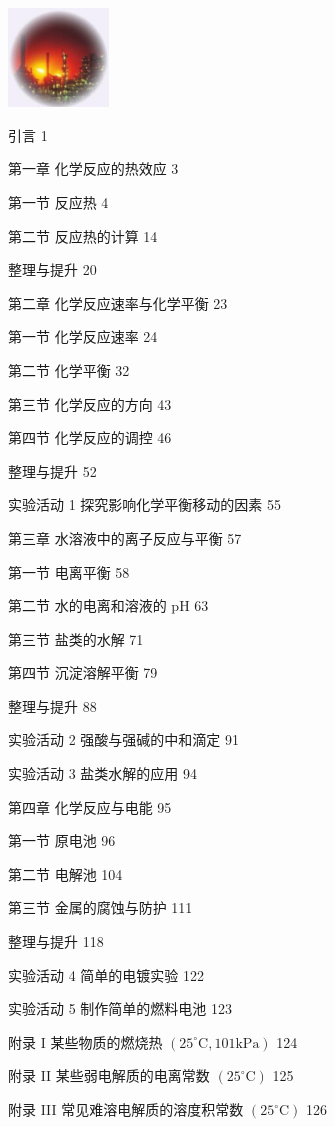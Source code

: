 \documentclass[10pt]{article}
\begin{document}
\begin{center}
\includegraphics[max width=0.2\textwidth]{images/0190da9d-8bfd-732f-bc2c-0b21d0f13b91_4_631661.jpg}
\end{center}

引言 1

第一章 化学反应的热效应 3

第一节 反应热 4

第二节 反应热的计算 14

整理与提升 20

第二章 化学反应速率与化学平衡 23

第一节 化学反应速率 24

第二节 化学平衡 32

第三节 化学反应的方向 43

第四节 化学反应的调控 46

整理与提升 52

实验活动 1 探究影响化学平衡移动的因素 55

第三章 水溶液中的离子反应与平衡 57

第一节 电离平衡 58

第二节 水的电离和溶液的 \(\mathrm{{pH}}\) 63

第三节 盐类的水解 71

第四节 沉淀溶解平衡 79

整理与提升 88

实验活动 2 强酸与强碱的中和滴定 91

实验活动 3 盐类水解的应用 94

第四章 化学反应与电能 95

第一节 原电池 96

第二节 电解池 104

第三节 金属的腐蚀与防护 111

整理与提升 118

实验活动 4 简单的电镀实验 122

实验活动 5 制作简单的燃料电池 123

附录 I 某些物质的燃烧热 \(\left( {{25}^{ \circ }\mathrm{C},{101}\mathrm{{kPa}}}\right)\) 124

附录 II 某些弱电解质的电离常数 \(\left( {{25}^{ \circ }\mathrm{C}}\right)\) 125

附录 III 常见难溶电解质的溶度积常数 \(\left( {{25}^{ \circ }\mathrm{C}}\right)\) 126
\end{document}
